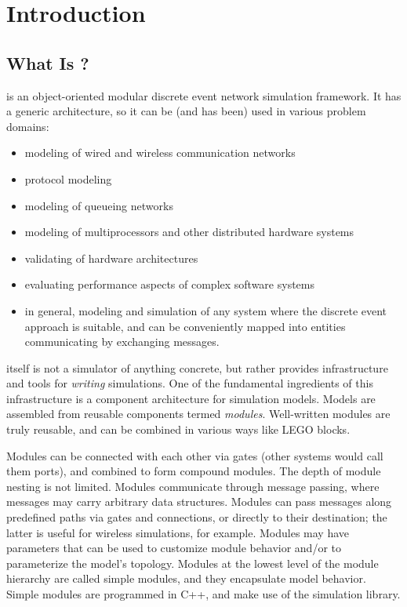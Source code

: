 \chapter{Introduction}
\label{cha:introduction}


\section{What Is {\opp}?}
\label{sec:introduction:what-is-omnetpp}

{\opp} is an object-oriented modular discrete event network simulation
framework. It has a generic architecture, so it can be (and has been)
used in various problem domains:

\begin{itemize}
  \item modeling of wired and wireless communication networks
  \item protocol modeling
  \item modeling of queueing networks
  \item modeling of multiprocessors and other distributed hardware systems
  \item validating of hardware architectures
  \item evaluating performance aspects of complex software systems
  \item in general, modeling and simulation of any system where the
        discrete event approach is suitable, and can be conveniently
        mapped into entities communicating by exchanging messages.
\end{itemize}

{\opp} itself is not a simulator of anything concrete, but rather
provides infrastructure and tools for \textit{writing} simulations. One of
the fundamental ingredients of this infrastructure is a component
architecture for simulation models. Models are assembled from reusable
components termed \textit{modules}. Well-written modules are truly reusable,
and can be combined in various ways like LEGO blocks.

Modules can be connected with each other via gates (other systems would
call them ports), and combined to form compound modules. The depth of
module nesting is not limited. Modules communicate through message passing,
where messages may carry arbitrary data structures. Modules can pass
messages along predefined paths via gates and connections, or directly to
their destination; the latter is useful for wireless simulations, for
example. Modules may have parameters that can be used to customize module
behavior and/or to parameterize the model's topology.
Modules at the lowest level of the module hierarchy are called
simple modules, and they encapsulate model behavior. Simple modules
are programmed in C++, and make use of the simulation library.

